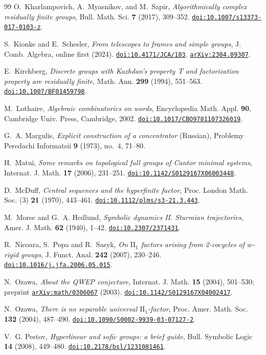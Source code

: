 \documentclass[11pt]{amsart}
\newcommand{\doi}[1]{\href{https://doi.org/#1}{\nolinkurl{doi:#1}}}
\newcommand{\arxiv}[1]{\href{https://arxiv.org/abs/#1}{\nolinkurl{arXiv:#1}}}
\begin{document}
\begin{thebibliography}{99}
O.~Kharlampovich, A.~Myasnikov, and M.~Sapir,
\emph{Algorithmically complex residually finite groups},
Bull. Math. Sci. \textbf{7} (2017), 309--352.
\doi{10.1007/s13373-017-0103-z}.

S.~Kionke and E.~Schesler,
\emph{From telescopes to frames and simple groups},
J. Comb. Algebra, online first (2024). \doi{10.4171/JCA/103}.
\arxiv{2304.09307}.

E.~Kirchberg, \emph{Discrete groups with Kazhdan's property~$T$ and
factorization property are residually finite},
Math. Ann. \textbf{299} (1994), 551--563.
\doi{10.1007/BF01459798}.

M.~Lothaire, \emph{Algebraic combinatorics on words}, Encyclopedia Math.
Appl. \textbf{90}, Cambridge Univ. Press, Cambridge, 2002.
\doi{10.1017/CBO9781107326019}.

G.~A. Margulis, \emph{Explicit construction of a concentrator}
(Russian), Problemy Peredachi Informatsii \textbf{9} (1973), no.~4,
71--80.

H.~Matui, \emph{Some remarks on topological full groups of Cantor
minimal systems}, Internat. J. Math. \textbf{17} (2006), 231--251.
\doi{10.1142/S0129167X06003448}.

D.~McDuff, \emph{Central sequences and the hyperfinite factor},
Proc. London Math. Soc. (3) \textbf{21} (1970), 443--461.
\doi{10.1112/plms/s3-21.3.443}.

M.~Morse and G.~A. Hedlund,
\emph{Symbolic dynamics II. Sturmian trajectories},
Amer. J. Math. \textbf{62} (1940), 1--42.
\doi{10.2307/2371431}.

R.~Nicoara, S.~Popa and R.~Sasyk, \emph{On $\mathrm{II}_1$ factors
arising from 2-cocycles of $w$-rigid groups}, J. Funct. Anal.
\textbf{242} (2007), 230--246. \doi{10.1016/j.jfa.2006.05.015}.

N.~Ozawa, \emph{About the QWEP conjecture},
Internat. J. Math. \textbf{15} (2004), 501--530; preprint \arxiv{math/0306067} (2003).
\doi{10.1142/S0129167X04002417}.

N.~Ozawa, \emph{There is no separable universal $\mathrm{II}_1$-factor},
Proc. Amer. Math. Soc. \textbf{132} (2004), 487--490.
\doi{10.1090/S0002-9939-03-07127-2}.

V.~G. Pestov, \emph{Hyperlinear and sofic groups: a brief guide},
Bull. Symbolic Logic \textbf{14} (2008), 449--480.
\doi{10.2178/bsl/1231081461}.


\end{thebibliography}
\end{document}
